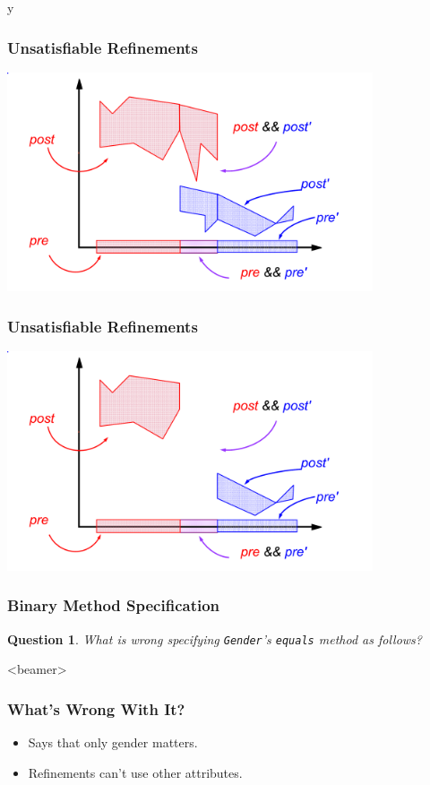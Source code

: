 \if y\MAKEHANDOUTS \documentclass[t,compress,landscape,handout]{beamer}
\newtheorem*{question}{Question}
\begin{document}
\begin{frame}
\frametitle{Unsatisfiable Refinements}
\includegraphics[width=4.25in]{unsatisfiable}
\end{frame}

\begin{frame}
\frametitle{Unsatisfiable Refinements}
\transdissolve[duration=0.5]
\includegraphics[width=4.25in]{unsatisfiable2}
\end{frame}

\begin{frame}[fragile]
\frametitle{Binary Method Specification}
\begin{question}
What is wrong specifying \lstinline!Gender!'s \lstinline!equals!
method as follows?

\rm

\end{question}
\end{frame}

\begin{frame}<beamer>
\frametitle{What's Wrong With It?}
\begin{itemize}
\item
Says that only gender matters.

\item
Refinements \alert{can't} use other attributes.
\end{itemize}
\end{frame}
\end{document}
